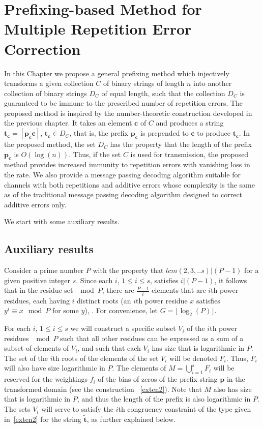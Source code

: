 \chapter[Prefixing-based Method for Multiple Repetition Error Correction]{Prefixing-based Method for  Multiple Repetition Error Correction}\label{prefixing}

 In this
Chapter we propose a general prefixing method which injectively
transforms a given collection $C$ of binary strings of length $n$
into another collection of binary strings $D_C$ of equal length,
such that the collection $D_C$ is guaranteed to be immune to the
prescribed number of repetition errors. The proposed method is
inspired by the number-theoretic construction developed in the
previous chapter. It takes an element $\mathbf{c}$ of $C$ and
produces a string $\mathbf{t_c} =[\mathbf{p_c} \mathbf{c}]$,
$\mathbf{t_c} \in D_C$, that is, the prefix $\mathbf{p_c}$ is
prepended to $\mathbf{c}$ to produce $\mathbf{t_c}$. In the proposed
method, the set $D_C$ has the property that the length of the prefix
$\mathbf{p_c}$ is $O(\log(n))$. Thus, if the set $C$ is used for
transmission, the proposed method provides increased immunity to
repetition errors with vanishing loss in the rate. We also provide a
message passing decoding algorithm suitable for channels with both
repetitions and additive errors whose complexity is the same as of
the traditional message passing decoding algorithm designed to
correct additive errors only.

 We start with some auxiliary
results.

\section{Auxiliary results}\label{aux}
Consider a prime number $P$ with the property that $lcm(2,3,..s) |
(P-1)$ for a given positive integer $s$. Since each $i$, $1 \leq i
\leq s$, satisfies $i|(P-1)$, it follows that in the residue set
$\mod P$, there are $\frac{P-1}{i}$ elements that are $i$th power
residues, each having $i$ distinct roots (an $i$th power residue
$x$ satisfies $y^i \equiv x \mod P$ for some $y$), \cite{apostol}.
For convenience, let $G = \lfloor \log_2(P) \rfloor$.

For each $i$, $1 \leq i \leq s$ we will construct a specific
subset $V_i$ of the $i$th power residues $\mod P$ such that all
other residues can be expressed as a sum of a subset  of elements
of $V_i$, and such that each $V_i$ has size that is logarithmic in
$P$. The set of the $i$th roots of the elements of the set $V_i$
will be denoted $F_i$. Thus, $F_i$ will also have size logarithmic
in $P$. The elements of $M =\bigcup_{i=1}^s F_i$ will be reserved
for the weightings $f_i$ of the bins of zeros of the prefix string
$\mathbf{p}$ in the transformed domain (see the construction
~\eqref{exten2}). Note that $M$ also has size that is logarithmic
in $P$, and thus the length of the prefix is also logarithmic in
$P$. The sets $V_i$ will serve to satisfy the $i$th congruency
constraint of the type given in~\eqref{exten2} for the string
$\mathbf{\tilde{t}}$, as further explained below.


